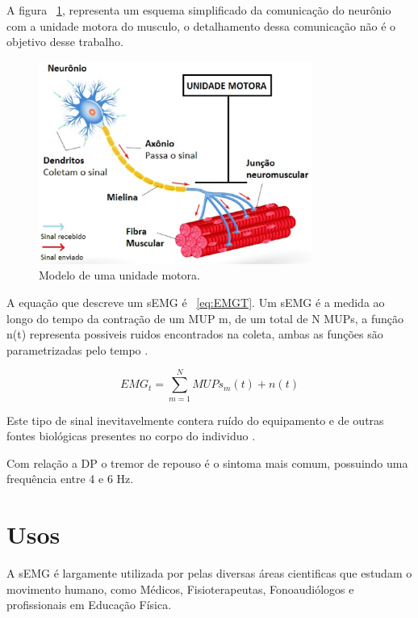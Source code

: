 A figura ~\ref{UnidadeMotora}, representa um esquema simplificado da comunicação do neurônio com a unidade motora do musculo, o detalhamento dessa comunicação não é o objetivo desse trabalho.

\begin{figure}[!htb]
    \centering
	\includegraphics[width=0.8\textwidth]{figuras/motor-neuron.eps}
	\caption{Modelo de uma unidade motora.}
	\label{UnidadeMotora}
\end{figure}

A equação que descreve um sEMG é ~\ref{eq:EMGT}. Um sEMG é a medida ao longo do tempo da contração de um MUP m, de um total de N MUPs, a função n(t) representa possiveis ruidos encontrados na coleta, ambas as funções são parametrizadas pelo tempo \cite{yousefi2014characterizing}.

\begin{equation} \label{eq:EMGT}
	EMG_{t} =\sum_{m=1}^{N} MUPs_{m}(t)+n(t)
\end{equation}

Este tipo de sinal inevitavelmente contera ruído do equipamento e de outras fontes biológicas presentes no corpo do individuo \cite{yousefi2014characterizing}.

Com relação a DP o tremor de repouso é o sintoma mais comum, possuindo uma frequência entre 4 e 6 Hz.
\cite{jankovic2008parkinson}

\section{Usos}
A sEMG é largamente utilizada por pelas diversas áreas cientificas que estudam o movimento humano, como Médicos, Fisioterapeutas, Fonoaudiólogos e profissionais em Educação Física\cite{nascimento2012surface}.

